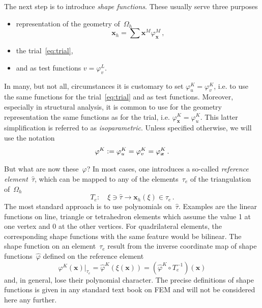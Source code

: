 \documentclass[a4paper,DIV=12,10pt]{scrartcl}
\newcommand{\vek}[1]{\boldsymbol{#1}}  %
\newcommand{\defeq}{\vcentcolon=} %
\newcommand{\x}[0]{\vek{x}}
\begin{document}
The next step is to introduce \emph{shape functions}. These usually
serve three purposes
\begin{itemize}
\item representation of the geometry of~$\Omega_h$
  \begin{equation}
    \label{eq:geometry}
    \x_h = \sum \x^M \varphi^M_{\x} \,,
  \end{equation}
\item the trial~\eqref{eq:trial}, 
\item and as test functions $v = \varphi^L_v$.
\end{itemize}
In many, but not all, circumstances it is customary to set $\varphi^K_u =
\varphi^K_v$, i.e. to use the same functions for the
trial~\eqref{eq:trial} and as test functions. Moreover, especially in
structural analysis, it is common to use for the geometry
representation the same functions as for the trial, i.e. $\varphi_{\x}^K =
\varphi_u^K$. This latter simplification is referred to as
\emph{isoparametric}. Unless specified otherwise, we will use the
notation
\begin{equation}
  \label{eq:isoparam}
  \varphi^K \defeq \varphi^K_u = \varphi^K_v = \varphi^K_{\x}\,.
\end{equation}

But what are now these~$\varphi$? In most cases, one introduces a
so-called \emph{reference element}~$\hat{\tau}$, which can be mapped
to any of the elements~$\tau_e$ of the triangulation of~$\Omega_h$
\begin{equation}
  \label{eq:map}
  T_e: \quad \xi \ni \hat{\tau} \to \x_h(\xi) \in \tau_e\,.
\end{equation}
The most standard approach is to use polynomials
on~$\hat{\tau}$. Examples are the linear functions on line, triangle
or tetrahedron elements which assume the value 1 at one vertex and 0
at the other vertices. For quadrilateral elements, the corresponding
shape functions with the same feature would be bilinear.  The shape
function on an element~$\tau_e$ result from the inverse coordinate map
of shape functions~$\hat{\varphi}$ defined on the reference element
\begin{equation}
  \label{eq:shapefun}
  \varphi^K(\x)|_{\tau_e} = \hat{\varphi}^K( \xi(\x) ) 
  = (\hat{\varphi}^K \circ T_e^{-1})(\x)
\end{equation}
and, in general, lose their polynomial character. The precise
definitions of shape functions is given in any standard text book on
FEM and will not be considered here any further.
\end{document}
